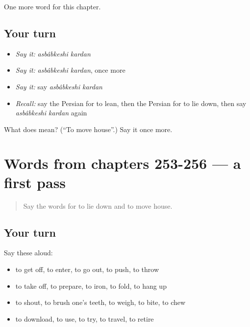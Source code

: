 \begin{grammarlens}[title={What you've built}]
One more word for this chapter.
\end{grammarlens}

\subsection*{Your turn}
\begin{itemize}
\raggedright
  \item \emph{Say it:} \emph{asbâbkeshi kardan}
  \item \emph{Say it:} \emph{asbâbkeshi kardan}, once more
  \item \emph{Say it:} say \emph{asbâbkeshi kardan}
  \item \emph{Recall:} say the Persian for to lean, then the Persian for to lie down, then say \emph{asbâbkeshi kardan} again
\end{itemize}

\begin{tcolorbox}[breakable,colback=teal!4,colframe=teal!35!black,title={Before you move on}]
What does    mean? (\textquotedblleft{}To move house\textquotedblright{}.) Say it once more.
\end{tcolorbox}
\section[(dialogue)]{Words from chapters 253-256 — a first pass}

\label{lesson:FA-R261-first-pass-words-from-chapters-253-256}



\begin{quote}
Say the words for to lie down and to move house.
\end{quote}

\subsection*{Your turn}
Say these aloud:

\begin{itemize}
\raggedright
  \item to get off, to enter, to go out, to push, to throw
  \item to take off, to prepare, to iron, to fold, to hang up
  \item to shout, to brush one's teeth, to weigh, to bite, to chew
  \item to download, to use, to try, to travel, to retire
\end{itemize}

